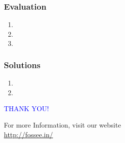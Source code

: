 \documentclass{beamer}
\begin{document}
\begin{frame}[fragile]
\frametitle{Evaluation}
\begin{enumerate}
\item 
\item 
\item 
\end{enumerate}
\end{frame}
\begin{frame}

\frametitle{Solutions}
\begin{enumerate}
\item 
\vspace{15pt}
\item 
\end{enumerate}
\end{frame}
\begin{frame}

\begin{block}{}
  \begin{center}
  \textcolor{blue}{\Large THANK YOU!} 
  \end{center}
  \end{block}
\begin{block}{}
  \begin{center}
    For more Information, visit our website\\
    \url{http://fossee.in/}
  \end{center}  
  \end{block}
\end{frame}
\end{document}
